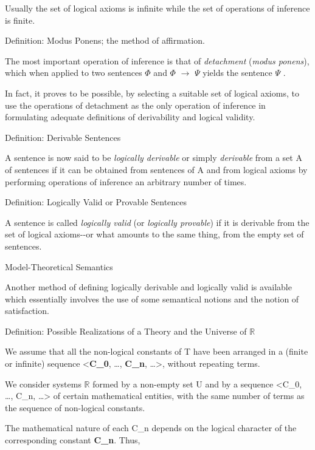 Usually the set of logical axioms is infinite while the set of
operations of inference is finite.

\protect\hypertarget{anchor-12}{}{}Definition: Modus Ponens; the method
of affirmation.

The most important operation of inference is that of \emph{detachment}
(\emph{modus ponens}), which when applied to two sentences $\Phi$  and $\Phi$ $\to$ $\Psi$
yields the sentence $\Psi$ .

In fact, it proves to be possible, by selecting a suitable set of
logical axioms, to use the operations of detachment as the only
operation of inference in formulating adequate definitions of
derivability and logical validity.

\protect\hypertarget{anchor-13}{}{}Definition: Derivable Sentences

A sentence is now said to be \emph{logically derivable} or simply
\emph{derivable} from a set A of sentences if it can be obtained from
sentences of A and from logical axioms by performing operations of
inference an arbitrary number of times.

\protect\hypertarget{anchor-14}{}{}Definition: Logically Valid or
Provable Sentences

A sentence is called \emph{logically valid} (or \emph{logically
provable}) if it is derivable from the set of logical axioms-\/-or what
amounts to the same thing, from the empty set of sentences.

\protect\hypertarget{anchor-15}{}{}Model-Theoretical Semantics

Another method of defining logically derivable and logically valid is
available which essentially involves the use of some semantical notions
and the notion of satisfaction.

\protect\hypertarget{anchor-16}{}{}Definition: Possible Realizations of
a Theory and the Universe of $\mathbb{R}$

We assume that all the non-logical constants of T have been arranged in
a (finite or infinite) sequence \textless{}\textbf{C\_0}, \ldots,
\textbf{C\_n}, \ldots\textgreater, without repeating terms.

We consider systems $\mathbb{R}$  formed by a non-empty set U and by a sequence
\textless C\_0, \ldots, C\_n, \ldots\textgreater{} of certain
mathematical entities, with the same number of terms as the sequence of
non-logical constants.

The mathematical nature of each C\_n depends on the logical character of
the corresponding constant \textbf{C\_n}. Thus,

